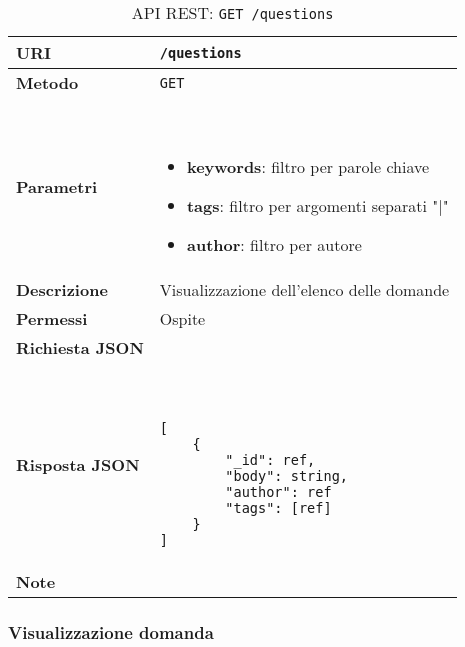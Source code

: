         \begin{table}[H]
            \begin{center}
                \begin{tabular}{p{} p{}}
                    \toprule
                    \textbf{URI} & \texttt{/questions} \\ \midrule
                    \textbf{Metodo} & \texttt{GET} \\ \midrule
                    \textbf{Parametri} & \
                        \begin{itemize}
                            \item \textbf{keywords}: filtro per parole chiave
                            \item \textbf{tags}: filtro per argomenti separati "|" 
                            \item \textbf{author}: filtro per autore
                        \end{itemize}
                        \\ \midrule
                    \textbf{Descrizione} & Visualizzazione dell'elenco delle domande \\ \midrule
                    \textbf{Permessi} & Ospite \\ \midrule
                    \textbf{Richiesta JSON} & \\ \midrule
                    \textbf{Risposta JSON} & \
                        \begin{lstlisting}[basicstyle={\ttfamily}]
[
    {
        "_id": ref,
        "body": string,
        "author": ref
        "tags": [ref]
    }
]
                        \end{lstlisting}
                        \\ \midrule
                    \textbf{Note} & \\
                    \bottomrule
                \end{tabular}
                \caption{API REST: \texttt{GET /questions}}
            \end{center}
        \end{table}

    \subsubsection{Visualizzazione domanda}

